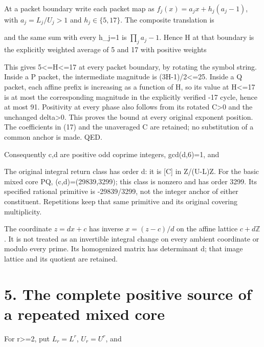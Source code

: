 At a packet boundary write each packet map as
\(f_j(x)=a_jx+h_j(a_j-1)\), with \(a_j=L_j/U_j>1\) and
\(h_j\in\{5,17\}\). The composite translation is


and the same sum with every h\_j=1 is \(\prod_ja_j-1\). Hence H at that
boundary is the explicitly weighted average of 5 and 17 with positive
weights


This gives 5\textless=H\textless=17 at every packet boundary, by
rotating the symbol string. Inside a P packet, the intermediate
magnitude is (3H-1)/2\textless=25. Inside a Q packet, each affine prefix
is increasing as a function of H, so its value at H\textless=17 is at
most the corresponding magnitude in the explicitly verified -17 cycle,
hence at most 91. Positivity at every phase also follows from its
rotated C\textgreater0 and the unchanged delta\textgreater0. This proves
the bound at every original exponent position. The coefficients in (17)
and the unaveraged C are retained; no substitution of a common anchor is
made. QED.

Consequently c,d are positive odd coprime integers, gcd(d,6)=1, and


The original integral return class has order d: it is {[}C{]} in
Z/(U-L)Z. For the basic mixed core PQ, (c,d)=(29839,3299); this class is
nonzero and has order 3299. Its specified rational primitive is
-29839/3299, not the integer anchor of either constituent. Repetitions
keep that same primitive and its original covering multiplicity.

The coordinate \(z=dx+c\) has inverse \(x=(z-c)/d\) on the affine
lattice \(c+d\mathbb Z\). It is not treated as an invertible integral
change on every ambient coordinate or modulo every prime. Its
homogenized matrix has determinant d; that image lattice and its
quotient are retained.

\section{5. The complete positive source of a repeated mixed core}

For r\textgreater=2, put \(L_r=L^r\), \(U_r=U^r\), and


